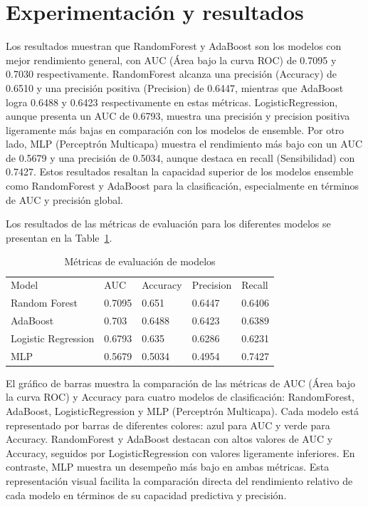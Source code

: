 \documentclass[
  number,
  preprint,
  3p,
  twocolumn]{elsarticle}
\begin{document}
\section{Experimentación y
resultados}\label{experimentaciuxf3n-y-resultados}

Los resultados muestran que RandomForest y AdaBoost son los modelos con
mejor rendimiento general, con AUC (Área bajo la curva ROC) de 0.7095 y
0.7030 respectivamente. RandomForest alcanza una precisión (Accuracy) de
0.6510 y una precisión positiva (Precision) de 0.6447, mientras que
AdaBoost logra 0.6488 y 0.6423 respectivamente en estas métricas.
LogisticRegression, aunque presenta un AUC de 0.6793, muestra una
precisión y precision positiva ligeramente más bajas en comparación con
los modelos de ensemble. Por otro lado, MLP (Perceptrón Multicapa)
muestra el rendimiento más bajo con un AUC de 0.5679 y una precisión de
0.5034, aunque destaca en recall (Sensibilidad) con 0.7427. Estos
resultados resaltan la capacidad superior de los modelos ensemble como
RandomForest y AdaBoost para la clasificación, especialmente en términos
de AUC y precisión global.

Los resultados de las métricas de evaluación para los diferentes modelos
se presentan en la Table~\ref{tbl-metricas}.

\begin{longtable}[]{@{}lllll@{}}

\caption{\label{tbl-metricas}Métricas de evaluación de modelos}

\tabularnewline

\toprule\noalign{}
\endhead
\bottomrule\noalign{}
\endlastfoot
Model & AUC & Accuracy & Precision & Recall \\
Random Forest & 0.7095 & 0.651 & 0.6447 & 0.6406 \\
AdaBoost & 0.703 & 0.6488 & 0.6423 & 0.6389 \\
Logistic Regression & 0.6793 & 0.635 & 0.6286 & 0.6231 \\
MLP & 0.5679 & 0.5034 & 0.4954 & 0.7427 \\

\end{longtable}

El gráfico de barras muestra la comparación de las métricas de AUC (Área
bajo la curva ROC) y Accuracy para cuatro modelos de clasificación:
RandomForest, AdaBoost, LogisticRegression y MLP (Perceptrón Multicapa).
Cada modelo está representado por barras de diferentes colores: azul
para AUC y verde para Accuracy. RandomForest y AdaBoost destacan con
altos valores de AUC y Accuracy, seguidos por LogisticRegression con
valores ligeramente inferiores. En contraste, MLP muestra un desempeño
más bajo en ambas métricas. Esta representación visual facilita la
comparación directa del rendimiento relativo de cada modelo en términos
de su capacidad predictiva y precisión.
\end{document}
